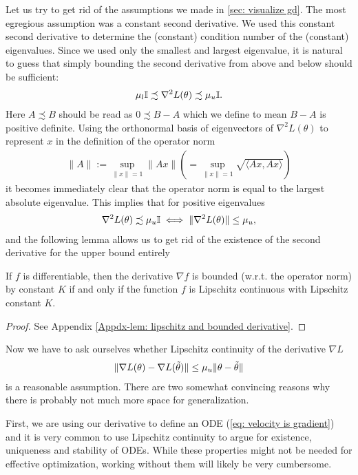 Let us try to get rid of the assumptions we made in \ref{sec: visualize gd}.
The most egregious assumption was a constant second derivative. We used this
constant second derivative to determine the (constant) condition number of
the (constant) eigenvalues. Since we used only the smallest and largest
eigenvalue, it is natural to guess that simply bounding the second derivative
from above and below should be sufficient:
%
\begin{align*}
	\mu_l \mathbb{I} \precsim \nabla^2 L(\theta) \precsim \mu_u \mathbb{I}.
\end{align*}
%
Here \(A \precsim B\) should be read as \(0\precsim B-A\) which we define to mean
\(B-A\) is positive definite. Using the orthonormal basis of eigenvectors of
\(\nabla^2 L(\theta)\) to represent \(x\) in the definition of the operator norm
%
\begin{align*}
	\|A\| := \sup_{\|x\| =1} \|Ax\|
	\left(= \sup_{\|x\| =1} \sqrt{\langle Ax, Ax\rangle}\right)
\end{align*}
%
it becomes immediately clear that the operator norm is equal to the largest
absolute eigenvalue. This implies that for positive eigenvalues 
%
\begin{align*}
	\nabla^2 L(\theta) \precsim \mu_u\mathbb{I}
	\iff \|\nabla^2 L(\theta)\|\le \mu_u,
\end{align*}
%
and the following lemma allows us to get rid of the existence of the second
derivative for the upper bound entirely
%
\begin{lemma}\label{lem: lipschitz and bounded derivative}
	If \(f\) is differentiable, then the derivative \(\nabla f\) is
	bounded (w.r.t. the operator norm) by constant \(K\) if and only if the function
	\(f\) is Lipschitz continuous with Lipschitz constant \(K\).
\end{lemma}
\begin{proof}
	See Appendix \ref{Appdx-lem: lipschitz and bounded derivative}.
\end{proof}
%
\noindent
Now we have to ask ourselves whether Lipschitz continuity of the derivative
\(\nabla L\)
%
\begin{align*}
	\| \nabla L(\theta) - \nabla L(\tilde{\theta})\|
	\le \mu_u \|\theta-\tilde{\theta}\|
\end{align*}
%
is a reasonable assumption. There are two somewhat convincing reasons why there
is probably not much more space for generalization.

First, we are using our derivative to define an ODE (\ref{eq: velocity is
gradient}) and it is very common to use Lipschitz continuity to argue for
existence, uniqueness and stability of ODEs. While these properties might not
be needed for effective optimization, working without them will likely be very
cumbersome.

